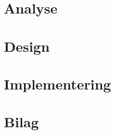 \documentclass[10pt,a4paper]{article}
\begin{document}
\thispagestyle{plain}




\newpage
\tableofcontents
\cleardoublepage
{}

\setcounter{page}{1}
\def\emptyline{\vspace{12pt}}

\section{Analyse}

\section{Design}

\section{Implementering}

\section{Bilag}
\end{document}

